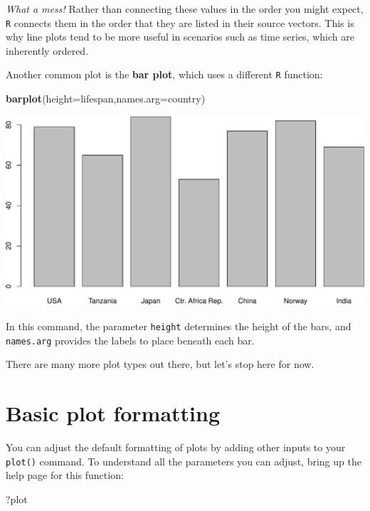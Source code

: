 \documentclass[]{book}
\newenvironment{Shaded}{\begin{snugshade}}{\end{snugshade}}
\newcommand{\DataTypeTok}[1]{\textcolor[rgb]{0.13,0.29,0.53}{#1}}
\newcommand{\KeywordTok}[1]{\textcolor[rgb]{0.13,0.29,0.53}{\textbf{#1}}}
\newcommand{\NormalTok}[1]{#1}
\begin{document}
\emph{What a mess!} Rather than connecting these values in the order you might expect, \texttt{R} connects them in the order that they are listed in their source vectors. This is why line plots tend to be more useful in scenarios such as time series, which are inherently ordered.

Another common plot is the \textbf{bar plot}, which uses a different \texttt{R} function:

\begin{Shaded}
\begin{Highlighting}[]
\KeywordTok{barplot}\NormalTok{(}\DataTypeTok{height=}\NormalTok{lifespan,}\DataTypeTok{names.arg=}\NormalTok{country)}
\end{Highlighting}
\end{Shaded}

\includegraphics{figures/unnamed-chunk-224-1.pdf}

In this command, the parameter \texttt{height} determines the height of the bars, and \texttt{names.arg} provides the labels to place beneath each bar.

There are many more plot types out there, but let's stop here for now.

\hypertarget{basic-plot-formatting}{%
\section*{Basic plot formatting}\label{basic-plot-formatting}}

You can adjust the default formatting of plots by adding other inputs to your \texttt{plot()} command. To understand all the parameters you can adjust, bring up the help page for this function:

\begin{Shaded}
\begin{Highlighting}[]
\NormalTok{?plot}
\end{Highlighting}
\end{Shaded}
\end{document}
